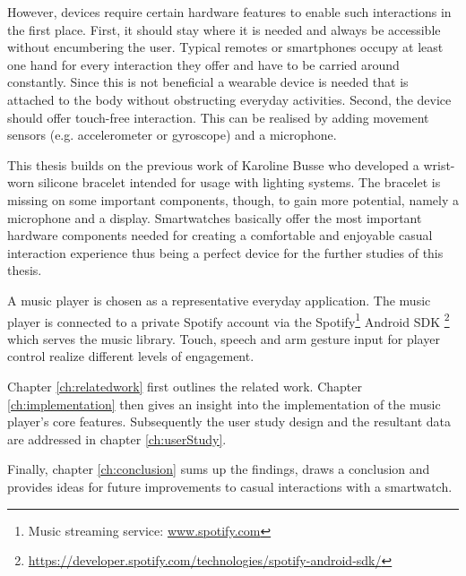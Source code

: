 However, devices require certain hardware features to enable such interactions in the first place. First, it should stay where it is needed and always be accessible without encumbering the user. Typical remotes or smartphones occupy at least one hand for every interaction they offer and have to be carried around constantly. Since this is not beneficial a wearable device is needed that is attached to the body without obstructing everyday activities.
Second, the device should offer touch-free interaction. This can be realised by adding movement sensors (e.g. accelerometer or gyroscope) and a microphone\cite{Busse2014Thesis}.

This thesis builds on the previous work of Karoline Busse \cite{Busse2014Thesis} who developed a wrist-worn silicone bracelet intended for usage with lighting systems. The bracelet is missing on some important components, though, to gain more potential, namely a microphone and a display. Smartwatches basically offer the most important hardware components needed for creating a comfortable and enjoyable casual interaction experience thus being a perfect device for the further studies of this thesis.

A music player is chosen as a representative everyday application. The music player is connected to a private Spotify account via the Spotify\footnote{Music streaming service: \url{www.spotify.com}} Android \ac{SDK} \footnote{\url{https://developer.spotify.com/technologies/spotify-android-sdk/}} which serves the music library. Touch, speech and arm gesture input for player control realize different levels of engagement.

Chapter \ref{ch:relatedwork} first outlines the related work. Chapter \ref{ch:implementation} then gives an insight into the implementation of the music player's core features. Subsequently the user study design and the resultant data are addressed in chapter \ref{ch:userStudy}.

Finally, chapter \ref{ch:conclusion} sums up the findings, draws a conclusion and provides ideas for future improvements to casual interactions with a smartwatch.







